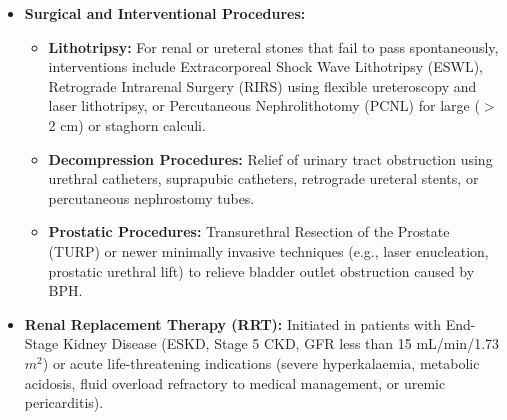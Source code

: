 \begin{itemize}
    \begin{itemize}
        \item \textbf{Fluid Optimization:} Increasing daily water intake to achieve a urine output of at least 2 to 2.5 liters per day is the cornerstone of preventing recurrent nephrolithiasis and reducing UTI frequency.
        \item \textbf{Dietary Restrictions:} Patients with CKD require dietary adjustments based on their stage of disease. This includes restricting dietary sodium (less than 2,000 mg/day) to control blood pressure, restricting potassium and phosphorus intake in advanced stages to prevent cardiotoxicity and bone disease, and avoiding excessive protein intake to reduce the production of nitrogenous waste.
        \item \textbf{Stone-specific Dietary Modifications:} For calcium oxalate stone formers, maintaining a normal calcium intake (which binds oxalate in the gastrointestinal tract, preventing its absorption) while restricting high-oxalate foods (e.g., spinach, rhubarb, nuts) and reducing sodium and animal protein intake.
    \end{itemize}
    \item \textbf{Surgical and Interventional Procedures:}
    \begin{itemize}
        \item \textbf{Lithotripsy:} For renal or ureteral stones that fail to pass spontaneously, interventions include Extracorporeal Shock Wave Lithotripsy (ESWL), Retrograde Intrarenal Surgery (RIRS) using flexible ureteroscopy and laser lithotripsy, or Percutaneous Nephrolithotomy (PCNL) for large ($>$ 2 cm) or staghorn calculi.
        \item \textbf{Decompression Procedures:} Relief of urinary tract obstruction using urethral catheters, suprapubic catheters, retrograde ureteral stents, or percutaneous nephrostomy tubes.
        \item \textbf{Prostatic Procedures:} Transurethral Resection of the Prostate (TURP) or newer minimally invasive techniques (e.g., laser enucleation, prostatic urethral lift) to relieve bladder outlet obstruction caused by BPH.
    \end{itemize}
    \item \textbf{Renal Replacement Therapy (RRT):} Initiated in patients with End-Stage Kidney Disease (ESKD, Stage 5 CKD, GFR less than 15 mL/min/1.73 $m^2$) or acute life-threatening indications (severe hyperkalaemia, metabolic acidosis, fluid overload refractory to medical management, or uremic pericarditis).

\end{itemize}
